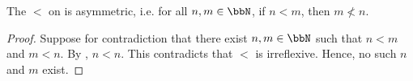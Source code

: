 \begin{lemma} \label{lemma:standard_order_on_natural_numbers_is_asymmetric}
    The  $<$ on  is asymmetric, i.e. for all $n,m \in \bbN$, if $n < m$, then $m \not< n$. 
\end{lemma}
\begin{proof}
    Suppose for contradiction that there exist $n,m \in \bbN$ such that $n < m$ and $m < n$. By , $n < n$. This contradicts that $<$ is irreflexive. Hence, no such $n$ and $m$ exist.
\end{proof}